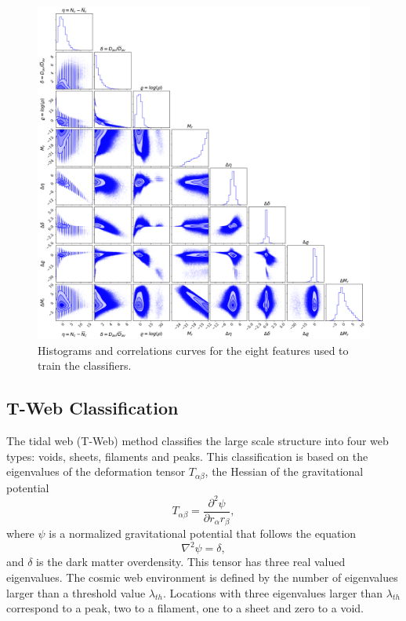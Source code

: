 \documentclass[usenatbib]{mnras}
\begin{document}
\begin{figure}
        \includegraphics[scale=0.38]{Figs/p_all_features_correlations.pdf}
    \caption{Histograms and correlations curves for the eight features used to train the classifiers.}
    \label{fig:features}
\end{figure}

\subsection{T-Web Classification}

The tidal web (T-Web) method \citep{Hahn2007,Forero-Romero2009} classifies the large scale
structure into four web types: voids, sheets, filaments and peaks. 
This classification is based on the eigenvalues of the deformation tensor $T_{\alpha\beta}$, the Hessian of the gravitational potential
\begin{equation}
T_{\alpha\beta}=\frac{\partial^2\psi}{\partial r_{\alpha}r_{\beta}},
\end{equation}
%
where $\psi$ is a normalized gravitational potential that follows the equation
\begin{equation}
    \nabla^2 \psi = \delta,
\end{equation}
%
and $\delta$ is the dark matter overdensity.
This tensor has three real valued eigenvalues. 
The cosmic web environment is defined by the number of eigenvalues larger than
a threshold value $\lambda_{th}$.
Locations with three eigenvalues larger than $\lambda_{th}$ correspond to a peak, two to a filament, one to a sheet and zero to a void.
\end{document}
